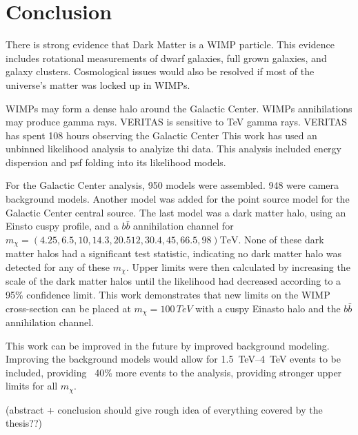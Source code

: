 \cleartooddpage[\thispagestyle{empty}]
\chapter{Conclusion}

There is strong evidence that Dark Matter is a WIMP particle.
This evidence includes rotational measurements of dwarf galaxies, full grown galaxies, and galaxy clusters.
Cosmological issues would also be resolved if most of the universe's matter was locked up in WIMPs.

WIMPs may form a dense halo around the Galactic Center.
WIMPs annihilations may produce gamma rays.
VERITAS is sensitive to TeV gamma rays.
VERITAS has spent 108 hours observing the Galactic Center
This work has used an unbinned likelihood analysis to analyize thi data.
This analysis included energy dispersion and psf folding into its likelihood models.

For the Galactic Center analysis, 950 models were assembled.
948 were camera background models.
Another model was added for the point source model for the Galactic Center central source.
The last model was a dark matter halo, using an Einsto cuspy profile, and a $b\bar{b}$ annihilation channel for $m_{\chi}=(4.25,6.5, 10, 14.3, 20.512, 30.4, 45, 66.5, 98) \textrm{TeV}$.
None of these dark matter halos had a significant test statistic, indicating no dark matter halo was detected for any of these $m_{\chi}$.
Upper limits were then calculated by increasing the scale of the dark matter halos until the likelihood had decreased according to a 95\% confidence limit.
This work demonstrates that new limits on the WIMP cross-section can be placed at $m_{\chi}=100\,TeV$ with a cuspy Einasto halo and the $b\bar{b}$ annihilation channel.

This work can be improved in the future by improved background modeling.
Improving the background models would allow for \SIrange{1.5}{4}{TeV} events to be included, providing ~40\% more events to the analysis, providing stronger upper limits for all $m_{\chi}$.

{\color{red}(abstract + conclusion should give rough idea of everything covered by the thesis??)}

